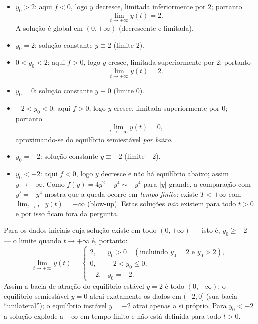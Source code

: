 \begin{itemize}
\item $y_0>2$: aqui $f<0$, logo $y$ decresce, limitada inferiormente por $2$; portanto
\[
\lim_{t\to+\infty}y(t)=2 .
\]
A solução é global em $(0,+\infty)$ (decrescente e limitada).

\item $y_0=2$: solução constante $y\equiv2$ (limite $2$).

\item $0<y_0<2$: aqui $f>0$, logo $y$ cresce, limitada superiormente por $2$; portanto
\[
\lim_{t\to+\infty}y(t)=2 .
\]

\item $y_0=0$: solução constante $y\equiv0$ (limite $0$).

\item $-2<y_0<0$: aqui $f>0$, logo $y$ cresce, limitada superiormente por $0$; portanto
\[
\lim_{t\to+\infty}y(t)=0 ,
\]
aproximando-se do equilíbrio semiestável \emph{por baixo}.

\item $y_0=-2$: solução constante $y\equiv-2$ (limite $-2$).

\item $y_0<-2$: aqui $f<0$, logo $y$ decresce e não há equilíbrio abaixo; assim $y\to-\infty$. Como $f(y)=4y^2-y^4\sim -y^4$ para $|y|$ grande, a comparação com $y'=-y^4$ mostra que a queda ocorre em \emph{tempo finito}: existe $T<+\infty$ com $\lim_{t\to T^-}y(t)=-\infty$ (blow-up). Estas soluções \emph{não} existem para todo $t>0$ e por isso ficam fora da pergunta.
\end{itemize}

\medskip\noindent
Para os dados iniciais cuja solução existe em todo $(0,+\infty)$ --- isto é, $y_0\ge-2$ --- o limite quando $t\to+\infty$ é, portanto:
\[
\lim_{t\to+\infty}y(t)=
\begin{cases}
2, & y_0>0\quad(\text{incluindo } y_0=2\text{ e } y_0>2),\\[2pt]
0, & -2<y_0\le0,\\[2pt]
-2, & y_0=-2 .
\end{cases}
\]
Assim a bacia de atração do equilíbrio estável $y=2$ é todo $(0,+\infty)$; o equilíbrio semiestável $y=0$ atrai exatamente os dados em $(-2,0]$ (sua bacia ``unilateral''); o equilíbrio instável $y=-2$ atrai apenas a si próprio. Para $y_0<-2$ a solução explode a $-\infty$ em tempo finito e não está definida para todo $t>0$.
